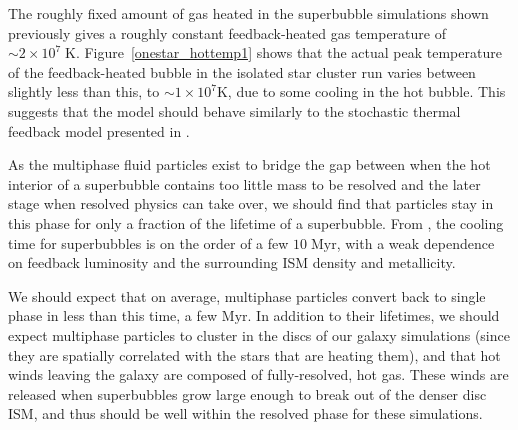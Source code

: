 The roughly fixed amount of gas heated in the superbubble simulations shown
previously gives a roughly constant feedback-heated gas temperature of $\sim
2\times10^7\;\mathrm{K}$.  Figure~\ref{onestar_hottemp1}  shows that the actual
peak temperature of the feedback-heated bubble in the isolated star cluster run
varies between slightly less than this, to $\sim 1\times10^7\mathrm{K}$,
due to some cooling in the hot bubble.  This suggests that the model should
behave similarly to the stochastic thermal feedback model presented in
\citet{DallaVecchia2012}.  

As the multiphase fluid particles exist to bridge the gap between when the hot
interior of a superbubble contains too little mass to be resolved and the later
stage when resolved physics can take over, we should find that particles stay in
this phase for only a fraction of the lifetime of a superbubble.  From
\citet{MacLow1988}, the cooling time for superbubbles is on the order of a few
$10\;\mathrm{Myr}$, with a weak dependence on feedback luminosity and the
surrounding ISM density and metallicity.

We should expect that on average, multiphase particles convert back to single
phase in less than this time, a few $\mathrm{Myr}$.  In addition to their
lifetimes, we should expect multiphase particles to cluster in the discs of our
galaxy simulations (since they are spatially correlated with the stars that are
heating them), and that hot winds leaving the galaxy are composed of
fully-resolved, hot gas.  These winds are released when superbubbles grow large
enough to break out of the denser disc ISM, and thus should be well within the
resolved phase for these simulations.

